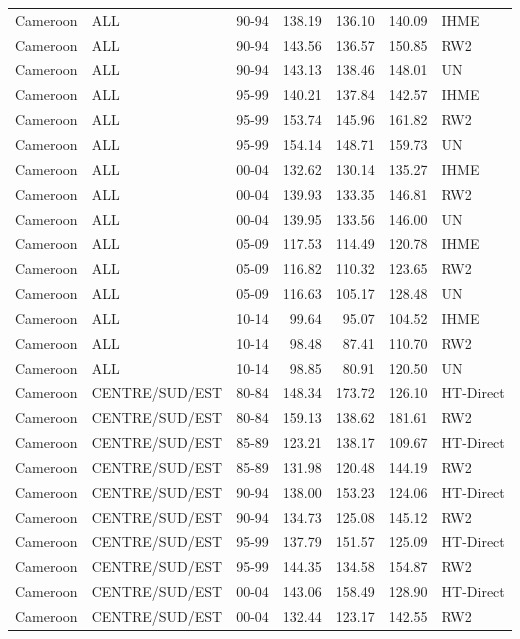 \begin{longtable}{lllrrrl}
  Cameroon & ALL & 90-94 & 138.19 & 136.10 & 140.09 & IHME \\ 
  Cameroon & ALL & 90-94 & 143.56 & 136.57 & 150.85 & RW2 \\ 
  Cameroon & ALL & 90-94 & 143.13 & 138.46 & 148.01 & UN \\ 
  Cameroon & ALL & 95-99 & 140.21 & 137.84 & 142.57 & IHME \\ 
  Cameroon & ALL & 95-99 & 153.74 & 145.96 & 161.82 & RW2 \\ 
  Cameroon & ALL & 95-99 & 154.14 & 148.71 & 159.73 & UN \\ 
  Cameroon & ALL & 00-04 & 132.62 & 130.14 & 135.27 & IHME \\ 
  Cameroon & ALL & 00-04 & 139.93 & 133.35 & 146.81 & RW2 \\ 
  Cameroon & ALL & 00-04 & 139.95 & 133.56 & 146.00 & UN \\ 
  Cameroon & ALL & 05-09 & 117.53 & 114.49 & 120.78 & IHME \\ 
  Cameroon & ALL & 05-09 & 116.82 & 110.32 & 123.65 & RW2 \\ 
  Cameroon & ALL & 05-09 & 116.63 & 105.17 & 128.48 & UN \\ 
  Cameroon & ALL & 10-14 & 99.64 & 95.07 & 104.52 & IHME \\ 
  Cameroon & ALL & 10-14 & 98.48 & 87.41 & 110.70 & RW2 \\ 
  Cameroon & ALL & 10-14 & 98.85 & 80.91 & 120.50 & UN \\ 
  Cameroon & CENTRE/SUD/EST & 80-84 & 148.34 & 173.72 & 126.10 & HT-Direct \\ 
  Cameroon & CENTRE/SUD/EST & 80-84 & 159.13 & 138.62 & 181.61 & RW2 \\ 
  Cameroon & CENTRE/SUD/EST & 85-89 & 123.21 & 138.17 & 109.67 & HT-Direct \\ 
  Cameroon & CENTRE/SUD/EST & 85-89 & 131.98 & 120.48 & 144.19 & RW2 \\ 
  Cameroon & CENTRE/SUD/EST & 90-94 & 138.00 & 153.23 & 124.06 & HT-Direct \\ 
  Cameroon & CENTRE/SUD/EST & 90-94 & 134.73 & 125.08 & 145.12 & RW2 \\ 
  Cameroon & CENTRE/SUD/EST & 95-99 & 137.79 & 151.57 & 125.09 & HT-Direct \\ 
  Cameroon & CENTRE/SUD/EST & 95-99 & 144.35 & 134.58 & 154.87 & RW2 \\ 
  Cameroon & CENTRE/SUD/EST & 00-04 & 143.06 & 158.49 & 128.90 & HT-Direct \\ 
  Cameroon & CENTRE/SUD/EST & 00-04 & 132.44 & 123.17 & 142.55 & RW2 \\ 

\end{longtable}
